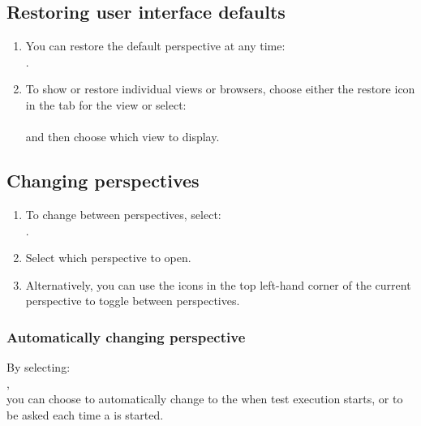 \subsection{Restoring user interface defaults}
\begin{enumerate}
\item You can restore the default perspective at any time: \\ 
.
\item To show or restore individual views or browsers, choose either the \bxcaption
{restore} icon in the tab for the view or  select: \\
\\
 and then choose which view to display.
\end{enumerate}

\subsection{Changing perspectives}
\begin{enumerate}
\item To change between perspectives, select:\\
.
\item Select which perspective to 
open. 

\item Alternatively, you can use the icons in the top left-hand
corner of the current perspective to toggle between perspectives. 
\end{enumerate}

\subsubsection{Automatically changing perspective}

By selecting:\\
 ,\\
you can choose to automatically change to the \execpersp{} when  test execution starts, 
or to be asked each time a \gdsuite{} is started. 








